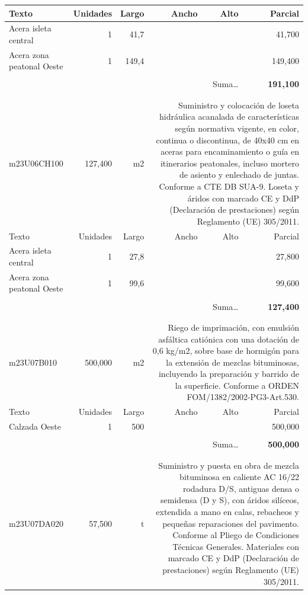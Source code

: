 \documentclass{book}%
\begin{document}
\begin{longtable}{lrrrrr}
Texto&Unidades&Largo&Ancho&Alto&Parcial\\%
\hline%
\multicolumn{1}{p{3.5cm}}{Acera isleta central}&1&41,7&&&    41,700\\%
\multicolumn{1}{p{3.5cm}}{Acera zona peatonal Oeste}&1&149,4&&&   149,400\\%
&&&&&\\%
\multicolumn{5}{r}{Suma\ldots}&\textbf{   191,100}\\%
\hline%
&&&&&\\%
&&&&&\\%
m23U06CH100&   127,400& m2&\multicolumn{3}{p{6cm}}{\scriptsize Suministro y colocación de loseta hidráulica acanalada de características según normativa vigente, en color, continua o discontinua, de 40x40 cm en aceras para encaminamiento o guía en itinerarios peatonales, incluso mortero de asiento y enlechado de juntas. Conforme a CTE DB SUA-9. Loseta y áridos con marcado CE y DdP (Declaración de prestaciones) según Reglamento (UE) 305/2011.\normalsize}\\%
Texto&Unidades&Largo&Ancho&Alto&Parcial\\%
\hline%
\multicolumn{1}{p{3.5cm}}{Acera isleta central}&1&27,8&&&    27,800\\%
\multicolumn{1}{p{3.5cm}}{Acera zona peatonal Oeste}&1&99,6&&&    99,600\\%
&&&&&\\%
\multicolumn{5}{r}{Suma\ldots}&\textbf{   127,400}\\%
\hline%
&&&&&\\%
&&&&&\\%
m23U07B010&   500,000& m2&\multicolumn{3}{p{6cm}}{\scriptsize Riego de imprimación, con emulsión asfáltica catiónica con una dotación de 0,6 kg/m2, sobre base de hormigón para la extensión de mezclas bituminosas, incluyendo la preparación y barrido de la superficie. Conforme a ORDEN FOM/1382/2002-PG3-Art.530.\normalsize}\\%
Texto&Unidades&Largo&Ancho&Alto&Parcial\\%
\hline%
\multicolumn{1}{p{3.5cm}}{Calzada Oeste}&1&500&&&   500,000\\%
&&&&&\\%
\multicolumn{5}{r}{Suma\ldots}&\textbf{   500,000}\\%
\hline%
&&&&&\\%
&&&&&\\%
m23U07DA020&    57,500& t&\multicolumn{3}{p{6cm}}{\scriptsize Suministro y puesta en obra de mezcla bituminosa en caliente AC 16/22 rodadura D/S, antiguas densa o semidensa (D y S), con áridos silíceos, extendida a mano en calas, rebacheos y pequeñas reparaciones del pavimento. Conforme al Pliego de Condiciones Técnicas Generales. Materiales con marcado CE y DdP (Declaración de prestaciones) según Reglamento (UE) 305/2011.\normalsize}\\%

\end{longtable}
\end{document}
